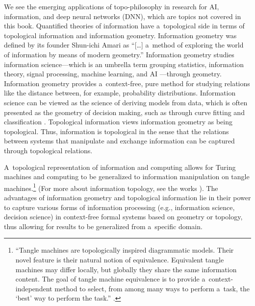 We see the emerging applications of topo-philosophy in research for AI, information, and deep neural networks (DNN), which are topics not covered in this book. Quantified theories of information have a~topological side in terms of topological information and information geometry. Information geometry was defined by its founder Shun-ichi Amari 
\parencite*[][]{amari_information_2016} %
 as ``[…] a~method of exploring the world of information by means of modern geometry.'' Information geometry studies information science---which is an umbrella term grouping statistics, information theory, signal processing, machine learning, and AI 
\parencite[][]{nielsen_elementary_2020}%
---through geometry. Information geometry provides a~context-free, pure method for studying relations like the distance between, for example, probability distributions. Information science can be viewed as the science of deriving models from data, which is often presented as the geometry of decision making, such as through curve fitting and classification 
\parencites[][]{nielsen_elementary_2020}[][]{nielsen_many_2022}. %
 Topological information views information geometry as being topological. Thus, information is topological in the sense that the relations between systems that manipulate and exchange information can be captured through topological relations.



A~topological representation of information and computing allows for Turing machines and computing to be generalized to information manipulation on tangle machines.\footnote{``Tangle machines are topologically inspired diagrammatic models. Their novel feature is their natural notion of equivalence. Equivalent tangle machines may differ locally, but globally they share the same information content. The goal of tangle machine equivalence is to provide a~context-independent method to select, from among many ways to perform a~task, the ‘best' way to perform the task.'' 
\parencite[][p.1]{carmi_tangle_2015}.%
} (For more about information topology, see the works 
\parencites[][]{moskovich_tangle_2014}[][]{carmi_tangle_2015}%
). The advantages of information geometry and topological information lie in their power to capture various forms of information processing (e.g., information science, decision science) in context-free formal systems based on geometry or topology, thus allowing for results to be generalized from a~specific domain.



